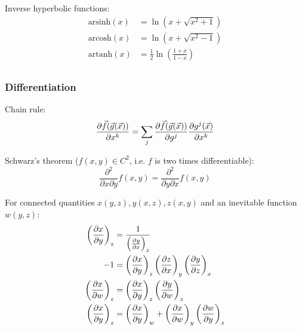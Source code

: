 			\noindent
			Inverse hyperbolic functions:
			\begin{equation}
				\begin{aligned}
					\mathrm{arsinh}(x) &= \ln\left(x+\sqrt{x^2+1}\right) \\
					\mathrm{arcosh}(x) &= \ln\left(x+\sqrt{x^2-1}\right) \\
					\mathrm{artanh}(x) &= \frac{1}{2}\ln\left(\frac{1+x}{1-x}\right) \\
				\end{aligned}
			\end{equation}

		\subsubsection{Differentiation}
			\noindent
			Chain rule:
			\begin{equation}
				\pdv{\vec{f}(\vec{g}(\vec{x}))}{x^k} = \sum_j \pdv{ \vec{f}(\vec{g}(\vec{x}))}{g^j} \pdv{g^j(\vec{x})}{x^k}
			\end{equation}

			\noindent
			Schwarz's theorem ($f(x,y)\in C^2$, i.e. $f$ is two times differentiable):
			\begin{equation}
				\frac{\partial^2 }{\partial x \partial y} f(x,y) = \frac{\partial^2 }{\partial y \partial x} f(x,y)
			\end{equation}

			\noindent
			For connected quantities $x(y,z), y(x,z), z(x,y)$ and an inevitable function $w(y,z)$:
			\begin{equation}
				\begin{aligned}
					\left( \pdv{x}{y} \right)_z &= \frac{1}{\left( \pdv{y}{x} \right)_z} \\
					-1 &= \left( \pdv{x}{y} \right)_z \left( \pdv{z}{x} \right)_y \left( \pdv{y}{z} \right)_x \\
					\left( \pdv{x}{w} \right)_z &= \left( \pdv{x}{y} \right)_z \left( \pdv{y}{w} \right)_z \\
					\left( \pdv{x}{y} \right)_z &= \left( \pdv{x}{y} \right)_w + \left( \pdv{x}{w} \right)_y \left( \pdv{w}{y} \right)_z \\
				\end{aligned}
			\end{equation}

